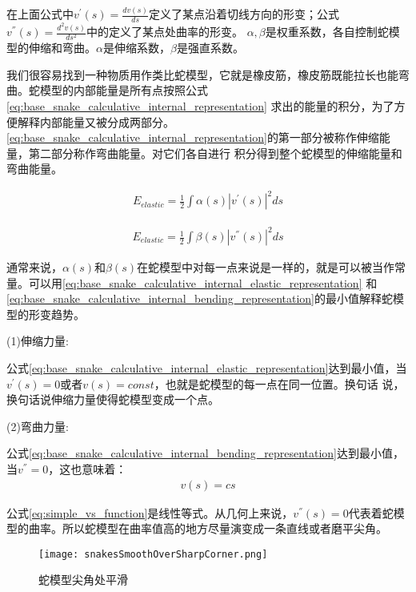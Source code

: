 在上面公式中$v^{'}(s)=\frac{dv(s)}{ds}$定义了某点沿着切线方向的形变；公式$v^{''}(s)=\frac{d^{2}v(s)}{ds^{2}}$中的定义了某点处曲率的形变。
$\alpha,\beta$是权重系数，各自控制蛇模型的伸缩和弯曲。$\alpha$是伸缩系数，$\beta$是强直系数。


我们很容易找到一种物质用作类比蛇模型，它就是橡皮筋，橡皮筋既能拉长也能弯曲。蛇模型的内部能量是所有点按照公式\eqref{eq:base_snake_calculative_internal_representation}
求出的能量的积分，为了方便解释内部能量又被分成两部分。\eqref{eq:base_snake_calculative_internal_representation}的第一部分被称作伸缩能量，第二部分称作弯曲能量。对它们各自进行
积分得到整个蛇模型的伸缩能量和弯曲能量。

\begin{align}\label{eq:base_snake_calculative_internal_elastic_representation}
	E_{elastic} = \frac{1}{2}\int\alpha(s)|v^{'}(s)|^{2}ds
\end{align}

\begin{align}\label{eq:base_snake_calculative_internal_bending_representation}
	E_{elastic} = \frac{1}{2}\int\beta(s)|v^{''}(s)|^{2}ds
\end{align}

通常来说，$\alpha(s)$和$\beta(s)$在蛇模型中对每一点来说是一样的，就是可以被当作常量。可以用\eqref{eq:base_snake_calculative_internal_elastic_representation}
和\eqref{eq:base_snake_calculative_internal_bending_representation}的最小值解释蛇模型的形变趋势。

(1)伸缩力量:

公式\eqref{eq:base_snake_calculative_internal_elastic_representation}达到最小值，当$v^{'}(s)=0$或者$v(s)=const$，也就是蛇模型的每一点在同一位置。换句话
说，换句话说伸缩力量使得蛇模型变成一个点。

(2)弯曲力量:

公式\eqref{eq:base_snake_calculative_internal_bending_representation}达到最小值，当$v^{''}=0$，这也意味着：
\begin{align}\label{eq:simple_vs_function}
	v(s) = cs
\end{align}

公式\eqref{eq:simple_vs_function}是线性等式。从几何上来说，$v^{''}(s)=0$代表着蛇模型的曲率。所以蛇模型在曲率值高的地方尽量演变成一条直线或者磨平尖角。

\begin{figure}[htbp]
	\centering
	\texttt{[image: snakesSmoothOverSharpCorner.png]}
	\caption{蛇模型尖角处平滑}\label{fig:snakesSmoothOverSharpCorner}
\end{figure}

